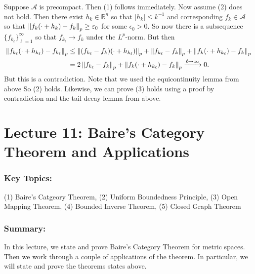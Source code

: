 \documentclass{article}
\begin{document}
\begin{itemize}
	\begin{solutions}
		Suppose $\mathcal{A}$ is precompact. Then (1) follows immediately. Now assume (2) does not hold. Then there exist $h_{k} \in \mathbb{R}^{n}$ so that $|h_{k}| \leq k^{-1}$ and corresponding $f_{k} \in \mathcal{A}$ so that $\left\Vert f_{k}(\cdot + h_{k}) - f_{k} \right\Vert_{p} \geq \varepsilon_{0}$ for some $\epsilon_{0} > 0$. So now there is a subsequence $\{f_{k_{\ell}}\}_{\ell = 1}^{\infty}$ so that $f_{k_{\ell}} \to f_{k}$ under the $L^{p}$-norm. But then 
			\begin{align}
				\begin{split}
					\left\Vert f_{k_{\ell}}(\cdot + h_{k_{\ell}}) - f_{k_{\ell}} \right\Vert_{p} &\leq \left\Vert (f_{k_{\ell}} - f_{k})(\cdot + h_{k_{\ell}}) \right\Vert_{p} + \left\Vert f_{k_{\ell}} - f_{k} \right\Vert_{p} + \left\Vert f_{k}(\cdot + h_{k_{\ell}}) - f_{k} \right\Vert_{p} \\
					&= 2\left\Vert f_{k_{\ell}} - f_{k} \right\Vert_{p} + \left\Vert f_{k}(\cdot + h_{k_{\ell}}) - f_{k} \right\Vert_{p} \xrightarrow{\ell \to \infty} 0. 
				\end{split}
			\end{align}
		But this is a contradiction. Note that we used the equicontinuity lemma from above So (2) holds. Likewise, we can prove (3) holds using a proof by contradiction and the tail-decay lemma from above. 
	\end{solutions} 
\end{itemize}

\newpage 
\section{Lecture 11: Baire's Category Theorem and Applications}
\subsubsection{Key Topics:} (1) Baire's Catgeory Theorem, (2) Uniform Boundedness Principle, (3) Open Mapping Theorem, (4) Bounded Inverse Theorem, (5) Closed Graph Theorem 
\subsubsection{Summary:} In this lecture, we state and prove Baire's Category Theorem for metric spaces. Then we work through a couple of applications of the theorem. In particular, we will state and prove the theorems states above. 
\end{document}

